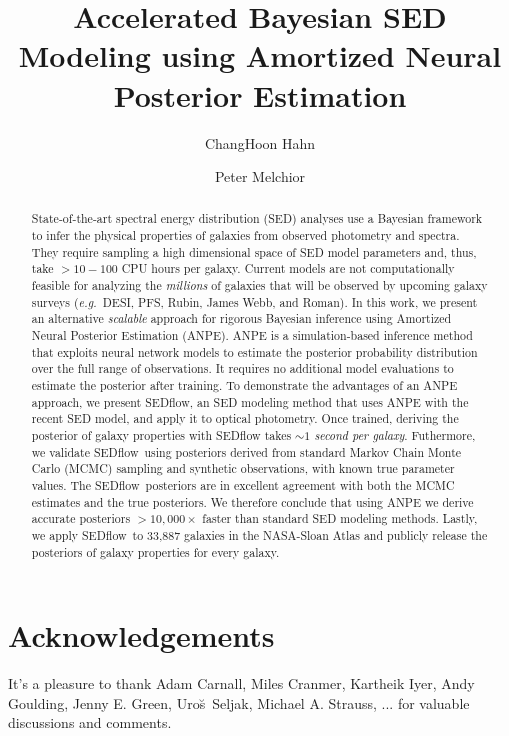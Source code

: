 \documentclass[12pt, letterpaper, preprint, comicneue]{aastex63}
\newcommand{\eg}{\emph{e.g.}}
\newcommand{\sedflow}{{\sc SEDflow}}
\begin{document}
 \sloppy\sloppypar\frenchspacing 

\title{Accelerated Bayesian SED Modeling using Amortized Neural Posterior Estimation}

\author[0000-0003-1197-0902]{ChangHoon Hahn}

\author{Peter Melchior}

\begin{abstract}
    State-of-the-art spectral energy distribution (SED) analyses use a
    Bayesian framework to infer the physical properties of galaxies from
    observed photometry and spectra.
    They require sampling a high dimensional space of SED model parameters and,
    thus, take $>10-100$ CPU hours per galaxy. 
    Current models are not computationally feasible for analyzing the {\em
    millions} of galaxies that will be observed by upcoming galaxy surveys
    (\eg~DESI, PFS, Rubin, James Webb, and Roman). 
    In this work, we present an alternative \emph{scalable} approach for
    rigorous Bayesian inference using Amortized Neural Posterior
    Estimation (ANPE). 
    ANPE is a simulation-based inference method that exploits neural network
    models to estimate the posterior probability distribution over the full
    range of observations.
    It requires no additional model evaluations to estimate the posterior after
    training. 
    To demonstrate the advantages of an ANPE approach, we present \sedflow, an
    SED modeling method that uses ANPE with the recent \cite{hahn2022}
    SED model, and apply it to optical photometry. 
    Once trained, deriving the posterior of galaxy properties with {\sc
    SEDflow} takes \emph{${\sim}1$ second per galaxy}. 
    Futhermore, we validate \sedflow~using posteriors derived from standard
    Markov Chain Monte Carlo (MCMC) sampling and synthetic observations, with
    known true parameter values.  
    The \sedflow~posteriors are in excellent agreement with both the MCMC
    estimates and the true posteriors. 
    We therefore conclude that using ANPE we derive accurate posteriors
    $>10,000\times$ faster than standard SED modeling methods. 
    Lastly, we apply \sedflow~to 33,887 galaxies in the NASA-Sloan Atlas and
    publicly release the posteriors of galaxy properties for every galaxy.
\end{abstract}









\section*{Acknowledgements}
It's a pleasure to thank 
    Adam Carnall, 
    Miles Cranmer, 
    Kartheik Iyer,
    Andy Goulding,
    Jenny E. Green,
    Uro{\u s}~Seljak,
    Michael A. Strauss, 
    ...
for valuable discussions and comments.

\appendix
%
 
\end{document}
